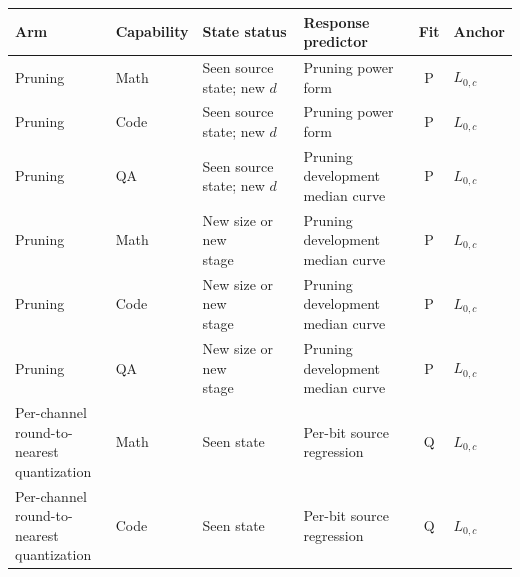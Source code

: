 \begin{table}[!htbp]\normalfont
\centering\small
\setlength{\tabcolsep}{3pt}\renewcommand{\arraystretch}{1.05}
\begin{tabular*}{\textwidth}{@{\extracolsep{\fill}}llllcl@{}}
\toprule
Arm & Capability & State status & Response predictor & Fit & Anchor \\
\midrule
Pruning & Math & Seen source state; new $d$ & Pruning power form & P & $L_{0,c}$ \\
Pruning & Code & Seen source state; new $d$ & Pruning power form & P & $L_{0,c}$ \\
Pruning & QA & Seen source state; new $d$ & \shortstack[l]{Pruning development\\median curve} & P & $L_{0,c}$ \\
Pruning & Math & \shortstack[l]{New size or new\\stage} & \shortstack[l]{Pruning development\\median curve} & P & $L_{0,c}$ \\
Pruning & Code & \shortstack[l]{New size or new\\stage} & \shortstack[l]{Pruning development\\median curve} & P & $L_{0,c}$ \\
Pruning & QA & \shortstack[l]{New size or new\\stage} & \shortstack[l]{Pruning development\\median curve} & P & $L_{0,c}$ \\
\addlinespace
\shortstack[l]{Per-channel\\round-to-nearest\\quantization} & Math & Seen state & \shortstack[l]{Per-bit source\\regression} & Q & $L_{0,c}$ \\
\shortstack[l]{Per-channel\\round-to-nearest\\quantization} & Code & Seen state & \shortstack[l]{Per-bit source\\regression} & Q & $L_{0,c}$ \\

\end{tabular*}
\end{table}
